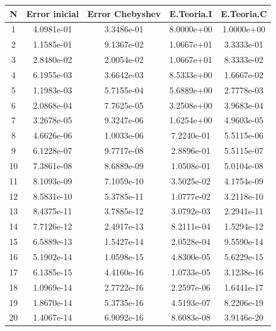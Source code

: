 \documentclass{article}
\begin{document}
\begin{tabular}{|c|c|c|c|c|}
\hline
N & Error inicial & Error Chebyshev & E.Teoria.I & E.Teoria.C \\
\hline
 1 & 4.0981e-01 & 3.3486e-01 & 8.0000e+00 & 1.0000e+00 \\ 
  2 & 1.1585e-01 & 9.1367e-02 & 1.0667e+01 & 3.3333e-01 \\ 
  3 & 2.8480e-02 & 2.0054e-02 & 1.0667e+01 & 8.3333e-02 \\ 
  4 & 6.1955e-03 & 3.6642e-03 & 8.5333e+00 & 1.6667e-02 \\ 
  5 & 1.1983e-03 & 5.7155e-04 & 5.6889e+00 & 2.7778e-03 \\ 
  6 & 2.0868e-04 & 7.7625e-05 & 3.2508e+00 & 3.9683e-04 \\ 
  7 & 3.2678e-05 & 9.3247e-06 & 1.6254e+00 & 4.9603e-05 \\ 
  8 & 4.6626e-06 & 1.0033e-06 & 7.2240e-01 & 5.5115e-06 \\ 
  9 & 6.1228e-07 & 9.7717e-08 & 2.8896e-01 & 5.5115e-07 \\ 
 10 & 7.3861e-08 & 8.6889e-09 & 1.0508e-01 & 5.0104e-08 \\ 
 11 & 8.1093e-09 & 7.1059e-10 & 3.5025e-02 & 4.1754e-09 \\ 
 12 & 8.5831e-10 & 5.3785e-11 & 1.0777e-02 & 3.2118e-10 \\ 
 13 & 8.4375e-11 & 3.7885e-12 & 3.0792e-03 & 2.2941e-11 \\ 
 14 & 7.7126e-12 & 2.4917e-13 & 8.2111e-04 & 1.5294e-12 \\ 
 15 & 6.5889e-13 & 1.5427e-14 & 2.0528e-04 & 9.5590e-14 \\ 
 16 & 5.1902e-14 & 1.0598e-15 & 4.8300e-05 & 5.6229e-15 \\ 
 17 & 6.1385e-15 & 4.4160e-16 & 1.0733e-05 & 3.1238e-16 \\ 
 18 & 1.0969e-14 & 2.7722e-16 & 2.2597e-06 & 1.6441e-17 \\ 
 19 & 1.8670e-14 & 5.3735e-16 & 4.5193e-07 & 8.2206e-19 \\ 
 20 & 1.4067e-14 & 6.9092e-16 & 8.6083e-08 & 3.9146e-20 \\ 
 \hline 
\end{tabular}
\end{document}
